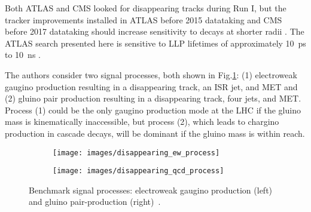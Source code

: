 \documentclass[12pt]{article}
\begin{document}
        Both ATLAS and CMS looked for disappearing tracks during Run I, but the tracker improvements installed in ATLAS before 2015 datataking and CMS before 2017 datataking should increase sensitivity to decays at shorter radii . The ATLAS search presented here is sensitive to LLP lifetimes of approximately \SI{10}{\pico\s} to \SI{10}{\nano\s} .

        The authors consider two signal processes, both shown in Fig.\ref{disappearing_processes}: (1) electroweak gaugino production resulting in a disappearing track, an ISR jet, and MET and (2) gluino pair production resulting in a disappearing track, four jets, and MET. Process (1) could be the only gaugino production mode at the LHC if the gluino mass is kinematically inaccessible, but process (2), which leads to chargino production in cascade decays, will be dominant if the gluino mass is within reach.

        \noindent \begin{figure}[htbp] \begin{center}
        \begin{subfigure}[htbp]{0.2\textwidth} \begin{center}
        \texttt{[image: images/disappearing\_ew\_process]}
        \end{center} \end{subfigure}
        \qquad
        \begin{subfigure}[htbp]{0.2\textwidth} \begin{center}
        \texttt{[image: images/disappearing\_qcd\_process]}
        \end{center} \end{subfigure}
            \caption{Benchmark signal processes: electroweak gaugino production (left) and gluino pair-production (right)~\cite{atlas_disappearing}.}
        \label{disappearing_processes}
        \end{center} \end{figure}
\end{document}
